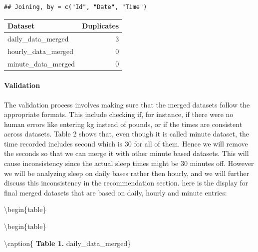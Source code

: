 \documentclass[
]{article}
\begin{document}
\begin{verbatim}
## Joining, by = c("Id", "Date", "Time")
\end{verbatim}

\begin{table}
\centering\begingroup\fontsize{14}{16}\selectfont

\begin{tabular}[t]{l|r}
\hline
Dataset & Duplicates\\
\hline
daily\_data\_merged & 3\\
\hline
hourly\_data\_merged & 0\\
\hline
minute\_data\_merged & 0\\
\hline
\end{tabular}
\endgroup{}
\end{table}

\hypertarget{validation}{%
\paragraph{Validation}\label{validation}}

The validation process involves making sure that the merged datasets
follow the appropriate formats. This include checking if, for instance,
if there were no human errors like entering kg instead of pounds, or if
the times are consistent across datasets. Table 2 shows that, even
though it is called minute dataset, the time recorded includes second
which is 30 for all of them. Hence we will remove the seconds so that we
can merge it with other minute based datasets. This will cause
inconsistency since the actual sleep times might be 30 minutes off.
However we will be analyzing sleep on daily bases rather then hourly,
and we will further discuss this inconsistency in the recommendation
section. here is the display for final merged datasets that are based on
daily, hourly and minute entries:

\textbackslash begin\{table\}

\caption{\label{tab:unnamed-chunk-6}Scrollable tables}

\textbackslash begin\{table\}

\textbackslash caption\{\label{tab:unnamed-chunk-6} \textbf{Table 1.}
daily\_data\_merged\} \centering
\end{document}
